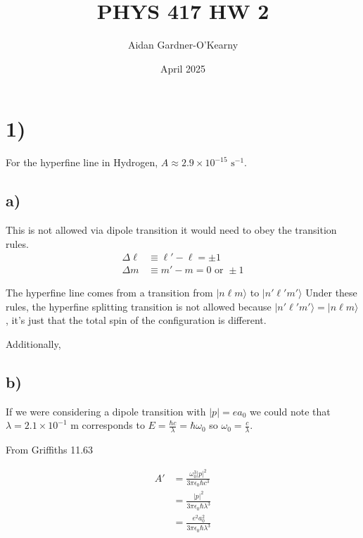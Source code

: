 \documentclass{article}
\title{PHYS 417 HW 2}
\author{Aidan Gardner-O'Kearny}
\date{April 2025}
\newcommand{\bra}[1]{|#1\rangle}
\begin{document}
\maketitle

\section*{1)}

For the hyperfine line in Hydrogen, $A\approx2.9\times10^{-15}\text{ s}^{-1}$.

\subsection*{a)}
This is not allowed via dipole transition it would need to obey the transition rules.
\begin{align*}
    \Delta{\ell}&\equiv{\ell'}-\ell=\pm1\\[1em]
    \Delta{m}&\equiv{m'}-m=0\text{ or }\pm1
\end{align*}

The hyperfine line comes from a transition from $\bra{n\ell{m}}$ to $\bra{n'\ell'm'}$ Under these rules, the hyperfine splitting transition is not allowed because $\bra{n'\ell'm'}=\bra{n\ell{m}}$, it's just that the total spin of the configuration is different.

Additionally, 

\subsection*{b)}


If we were considering a dipole transition with $|p|=ea_0$ we could note that $\lambda=2.1\times10^{-1}\text{ m}$ corresponds to $E=\frac{\hbar{c}}{\lambda}=\hbar\omega_0$ so $\omega_0=\frac{c}{\lambda}$.

From Griffiths 11.63

\begin{align*}
    A'&=\frac{\omega_0^3|p|^2}{3\pi\epsilon_0\hbar{c^3}}\\[1em]
    &=\frac{|p|^2}{3\pi\epsilon_0\hbar\lambda^3}\\[1em]
    &=\frac{e^2a_0^2}{3\pi\epsilon_0\hbar\lambda^3}
\end{align*}
\end{document}
